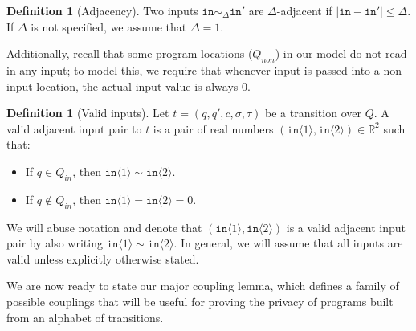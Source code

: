 \documentclass[12pt]{article}
\newcommand{\RR}{\mathbb{R}}
\newcommand{\brangle}[1]{\langle#1 \rangle}
\theoremstyle{definition}
\newtheorem{defn}[thm]{Definition}
\begin{document}
\begin{defn}[Adjacency]
    Two inputs $\texttt{in}\sim_{\Delta} \texttt{in}'$ are $\Delta$-adjacent if $|\texttt{in}-\texttt{in}'|\leq \Delta$. If $\Delta$ is not specified, we assume that $\Delta = 1$. 
\end{defn}

Additionally, recall that some program locations ($Q_{non}$) in our model do not read in any input; to model this, we require that whenever input is passed into a non-input location, the actual input value is always 0.

\begin{defn}[Valid inputs]
    Let $t = (q, q', c, \sigma, \tau)$ be a transition over $Q$. A valid adjacent input pair to $t$ is a pair of real numbers $(\texttt{in}\brangle{1}, \texttt{in}\brangle{2})\in \RR^2$ such that:
    \begin{itemize}
        \item If $q\in Q_{in}$, then $\texttt{in}\brangle{1}\sim \texttt{in}\brangle{2}$. 
        \item If $q\notin Q_{in}$, then $\texttt{in}\brangle{1} = \texttt{in}\brangle{2} = 0$.
    \end{itemize}
    We will abuse notation and denote that $(\texttt{in}\brangle{1}, \texttt{in}\brangle{2})$ is a valid adjacent input pair by also writing $\texttt{in}\brangle{1}\sim\texttt{in}\brangle{2}$. In general, we will assume that all inputs are valid unless explicitly otherwise stated.
\end{defn}


We are now ready to state our major coupling lemma, which defines a family of possible couplings that will be useful for proving the privacy of programs built from an alphabet of transitions. 
\end{document}
